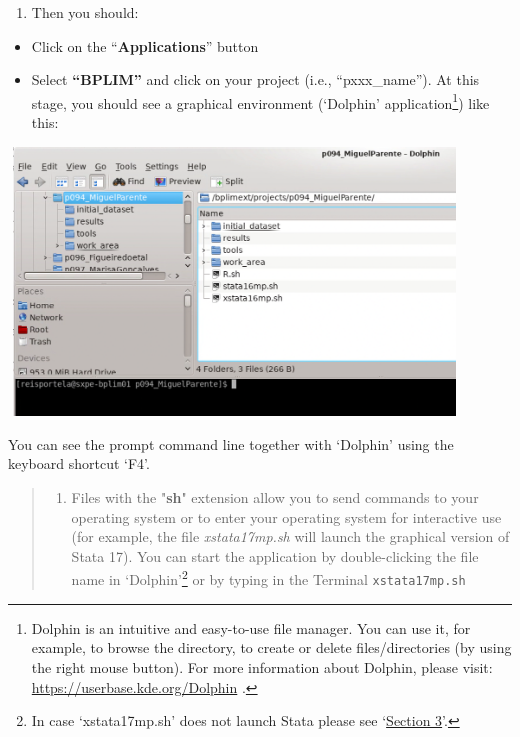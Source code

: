 \documentclass[
  11pt,
  a4paper,
]{article}
\providecommand{\tightlist}{%
  \setlength{\itemsep}{0pt}\setlength{\parskip}{0pt}}
\begin{document}
\begin{enumerate}
\def\labelenumi{\arabic{enumi}.}
\setcounter{enumi}{4}
\tightlist
\item
  Then you should:
\end{enumerate}

\begin{itemize}
\tightlist
\item
  Click on the ``\textbf{Applications}'' button
\item
  Select \textbf{``BPLIM''} and click on your project (i.e.,
  ``pxxx\_name''). At this stage, you should see a graphical environment
  (`Dolphin' application\footnote{Dolphin is an intuitive and
    easy-to-use file manager. You can use it, for example, to browse the
    directory, to create or delete files/directories (by using the right
    mouse button). For more information about Dolphin, please visit:
    \url{https://userbase.kde.org/Dolphin} .}) like this:
\end{itemize}

\includegraphics[width=4.72441in,height=2.80866in]{./media/image6.png}

You can see the prompt command line together with `Dolphin' using the
keyboard shortcut `F4'.

\begin{quote}
\begin{enumerate}
\def\labelenumi{\alph{enumi}.}
\setcounter{enumi}{2}
\tightlist
\item
  Files with the "\textbf{sh}" extension allow you to send commands to
  your operating system or to enter your operating system for
  interactive use (for example, the file \emph{xstata17mp.sh} will
  launch the graphical version of Stata 17). You can start the
  application by double-clicking the file name in `Dolphin'\footnote{In
    case `xstata17mp.sh' does not launch Stata please see
    `\protect\hyperlink{statistical_software}{Section 3}'.} or by typing
  in the Terminal \texttt{xstata17mp.sh}
\end{enumerate}
\end{quote}
\end{document}
